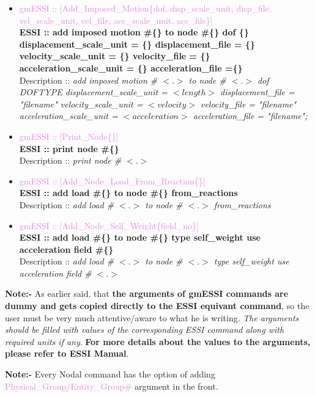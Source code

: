 \documentclass[11pt]{article}
\begin{document}
\begin{itemize}
  \item \textcolor{violet}{ gmESSI :: [Add\_Imposed\_Motion\{dof, disp\_scale\_unit, disp\_file, vel\_scale\_unit, vel\_file, acc\_scale\_unit, acc\_file\}]}\\
  \textbf{ ESSI :: add imposed motion \#\{\} to node \#\{\} dof \{\} displacement\_scale\_unit = \{\} displacement\_file = \{\} velocity\_scale\_unit = \{\} velocity\_file = \{\} acceleration\_scale\_unit = \{\} acceleration\_file =\{\}}\\
  Description :: \textit{add imposed motion \# $<.>$ to node \# $<.>$ dof DOFTYPE displacement\_scale\_unit = $<length>$ displacement\_file = "filename" velocity\_scale\_unit = $<velocity>$ velocity\_file = "filename" acceleration\_scale\_unit = $<acceleration>$ acceleration\_file = "filename";}

  \item \textcolor{violet}{ gmESSI :: [Print\_Node\{\}]}\\
  \textbf{ ESSI :: print node \#\{\} }\\
  Description :: \textit{print node \# $<.>$}

  \item \textcolor{violet}{ gmESSI :: [Add\_Node\_Load\_From\_Reaction\{\}]}\\
  \textbf{ ESSI :: add load \#\{\} to node \#\{\} from\_reactions }\\
  Description :: \textit{add load \# $<.>$ to node \# $<.>$ from\_reactions}

  \item \textcolor{violet}{ gmESSI :: [Add\_Node\_Self\_Weight\{field\_no\}]}\\
  \textbf{ ESSI :: add load \#\{\} to node \#\{\} type self\_weight use acceleration field \#\{\} }\\
  Description :: \textit{add load \# $<.>$ to node \# $<.>$ type self\_weight use acceleration field \# $<.>$}

\end{itemize}

\noindent \textbf{Note:-} As earlier said, that \textbf{the arguments of gmESSI commands are dummy and gets copied directly to the ESSI equivant command}, so the user must be very much attentive/aware to what he is writing. \textit{ The arguments should be filled with values of the corresponding ESSI command along with required units if any}. \textbf{For more details about the values to the arguments, please refer to ESSI Manual}.   

\noindent \textbf{Note:-} Every Nodal command has the option of adding \textcolor{violet}{Physical\_Group/Entity\_Group\#} argument in the front.
\end{document}

